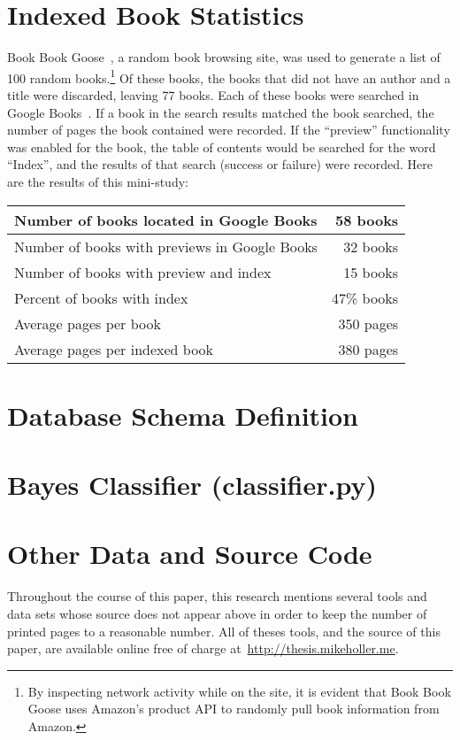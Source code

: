 \newpage \appendix \appendixpage \addappheadtotoc
\section{Indexed Book Statistics}
\label{appendix:d}

Book Book Goose~\cite{book-book-goose}, a random book browsing site, was used to generate a list of 100 random books.\footnote{By inspecting network activity while on the site, it is evident that Book Book Goose uses Amazon's product API\cite{amazon-products} to randomly pull book information from Amazon.}
Of these books, the books that did not have an author and a title were discarded, leaving 77 books.
Each of these books were searched in Google Books~\cite{google-books}.
If a book in the search results matched the book searched, the number of pages the book contained were recorded.
If the ``preview'' functionality was enabled for the book, the table of contents would be searched for the word ``Index'', and the results of that search (success or failure) were recorded.
Here are the results of this mini-study:

\begin{center}
\begin{tabular}{|l|r|}
\hline 
Number of books located in Google Books & 58 books \\ 
\hline 
Number of books with previews in Google Books & 32 books \\ 
\hline 
Number of books with preview and index & 15 books \\ 
\hline 
Percent of books with index & 47\% books \\ 
\hline
Average pages per book & 350 pages \\ 
\hline 
Average pages per indexed book & 380 pages \\ 
\hline 
\end{tabular}
\end{center}


\section{Database Schema Definition}
\label{appendix:a}


\section{\Naive Bayes Classifier (classifier.py)}
\label{appendix:b}


\section{Other Data and Source Code}
\label{appendix:c}

Throughout the course of this paper, this research mentions several tools and data sets whose source does not appear above in order to keep the number of printed pages to a reasonable number.
All of theses tools, and the source of this paper, are available online free of charge at~\url{http://thesis.mikeholler.me}.
